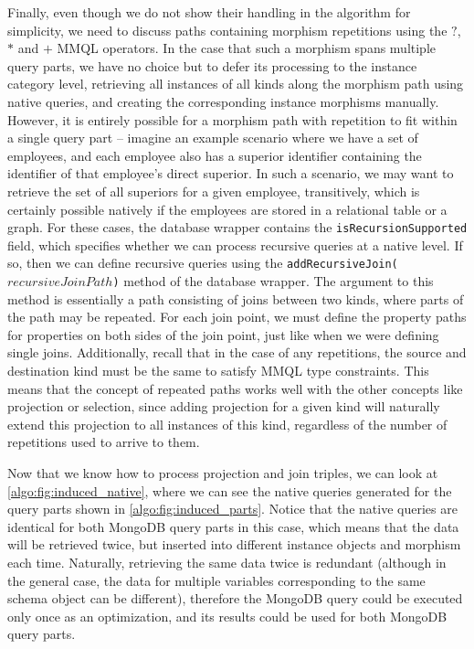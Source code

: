 Finally, even though we do not show their handling in the algorithm for simplicity, we need to discuss paths containing morphism repetitions using the $?$, $*$ and $+$ MMQL operators.
In the case that such a morphism spans multiple query parts, we have no choice but to defer its processing to the instance category level, retrieving all instances of all kinds along the morphism path using native queries, and creating the corresponding instance morphisms manually.
However, it is entirely possible for a morphism path with repetition to fit within a single query part -- imagine an example scenario where we have a set of employees, and each employee also has a superior identifier containing the identifier of that employee's direct superior.
In such a scenario, we may want to retrieve the set of all superiors for a given employee, transitively, which is certainly possible natively if the employees are stored in a relational table or a graph.
For these cases, the database wrapper contains the \texttt{isRecursionSupported} field, which specifies whether we can process recursive queries at a native level.
If so, then we can define recursive queries using the \texttt{addRecursiveJoin($recursiveJoinPath$)} method of the database wrapper.
The argument to this method is essentially a path consisting of joins between two kinds, where parts of the path may be repeated.
For each join point, we must define the property paths for properties on both sides of the join point, just like when we were defining single joins.
Additionally, recall that in the case of any repetitions, the source and destination kind must be the same to satisfy MMQL type constraints.
This means that the concept of repeated paths works well with the other concepts like projection or selection, since adding projection for a given kind will naturally extend this projection to all instances of this kind, regardless of the number of repetitions used to arrive to them.

Now that we know how to process projection and join triples, we can look at \cref{algo:fig:induced_native}, where we can see the native queries generated for the query parts shown in \cref{algo:fig:induced_parts}.
Notice that the native queries are identical for both MongoDB query parts in this case, which means that the data will be retrieved twice, but inserted into different instance objects and morphism each time.
Naturally, retrieving the same data twice is redundant (although in the general case, the data for multiple variables corresponding to the same schema object can be different), therefore the MongoDB query could be executed only once as an optimization, and its results could be used for both MongoDB query parts.

